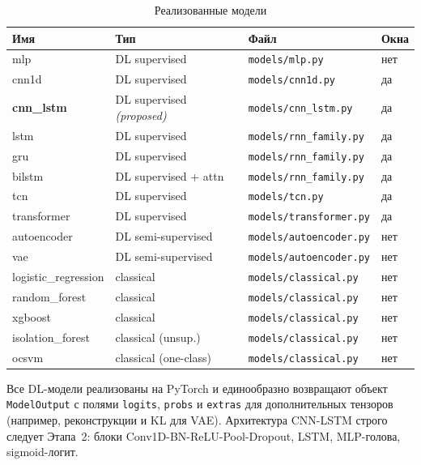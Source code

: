 \documentclass[14pt, a4paper]{extarticle}
\begin{document}
\begin{table}[H]
\centering
\caption{Реализованные модели}
\label{tab:models-impl}
\renewcommand{\arraystretch}{1.2}
\small
\begin{tabularx}{\linewidth}{@{}llXl@{}}
\toprule
\textbf{Имя} & \textbf{Тип} & \textbf{Файл} & \textbf{Окна} \\
\midrule
mlp                  & DL supervised        & \texttt{models/mlp.py}        & нет \\
cnn1d                & DL supervised        & \texttt{models/cnn1d.py}      & да  \\
\textbf{cnn\_lstm}   & DL supervised \emph{(proposed)} & \texttt{models/cnn\_lstm.py} & да \\
lstm                 & DL supervised        & \texttt{models/rnn\_family.py} & да \\
gru                  & DL supervised        & \texttt{models/rnn\_family.py} & да \\
bilstm               & DL supervised + attn & \texttt{models/rnn\_family.py} & да \\
tcn                  & DL supervised        & \texttt{models/tcn.py}        & да  \\
transformer          & DL supervised        & \texttt{models/transformer.py} & да \\
autoencoder          & DL semi-supervised   & \texttt{models/autoencoder.py} & нет \\
vae                  & DL semi-supervised   & \texttt{models/autoencoder.py} & нет \\
logistic\_regression & classical            & \texttt{models/classical.py}  & нет \\
random\_forest       & classical            & \texttt{models/classical.py}  & нет \\
xgboost              & classical            & \texttt{models/classical.py}  & нет \\
isolation\_forest    & classical (unsup.)   & \texttt{models/classical.py}  & нет \\
ocsvm                & classical (one-class)& \texttt{models/classical.py}  & нет \\
\bottomrule
\end{tabularx}
\end{table}

Все DL-модели реализованы на PyTorch и единообразно возвращают объект
\texttt{ModelOutput} с полями \texttt{logits}, \texttt{probs} и
\texttt{extras} для дополнительных тензоров (например, реконструкции и
KL для VAE). Архитектура CNN-LSTM строго следует 
Этапа~2: блоки Conv1D-BN-ReLU-Pool-Dropout, LSTM, MLP-голова, sigmoid-логит.
\end{document}
